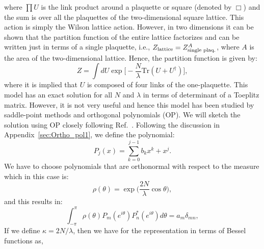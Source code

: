\documentclass[letter,11pt]{article}
\begin{document}
where $\prod U$ is the link product around a 
plaquette or square (denoted by $\Box$) and the sum is over all the plaquettes 
of the two-dimensional square lattice. 
This action is simply the Wilson lattice action. 
However, in two dimensions it can 
be shown that the partition function of the entire lattice factorizes and can be 
written just in terms of a single plaquette, i.e., $Z_{\rm{lattice}} = 
Z_{\text{single plaq.}}^{A}$, where $A$ is the area of the two-dimensional lattice. 
Hence, the partition function is given by: 
\begin{equation}
	Z = \int  dU \exp \Big[-\frac{N}{\lambda}\mbox{Tr} (U + U^{\dagger})\Big], 
\end{equation}
where it is implied that $U$ is composed of four links of the one-plaquette. This 
model has an exact solution for all $N$ and $\lambda$ 
in terms of determinant of a Toeplitz matrix. 
However, it is not very useful and hence this model has been studied by 
saddle-point methods and orthogonal polynomials (OP). 
We will sketch the solution using OP 
closely following Ref.~\cite{Goldschmidt:1979hq}. 
Following the discussion in Appendix~\ref{sec:Ortho_pol1}, we define the polynomial:
\begin{equation}
	P_{j}(x) = \sum_{k=0}^{j-1} b_{k} x^{k} + x^{j}. 
\end{equation} 
We have to choose polynomials that are orthonormal with respect to the measure which in this case is:
\begin{equation}
	\rho(\theta) = \exp\Big(\frac{2N}{\lambda} \cos \theta \Big),
\end{equation}
and this results in:
\begin{equation}
	\int_{-\pi}^{\pi} \rho(\theta) P_{m}(e^{i\theta}) P_{n}^{*}(e^{i\theta}) d\theta= a_{m} \delta_{mn},
\end{equation}
If we define $\kappa = 2N/\lambda$, then we have for the representation in terms of 
Bessel functions as, 
\end{document}
